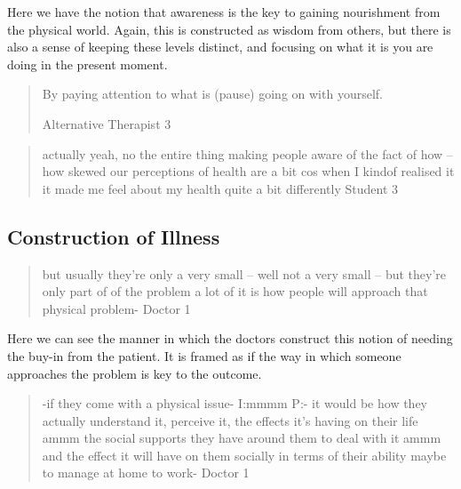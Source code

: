 Here we have the notion that awareness is the key to gaining nourishment from the physical world. Again, this is constructed as wisdom from others, but there is also a sense of keeping these levels distinct, and focusing on what it is you are doing in the present moment. 

\begin{quotation}
  
By paying attention to what is (pause) going on with yourself.

Alternative Therapist 3
\end{quotation}

\begin{quotation}
  actually yeah, no the entire thing making people aware of the fact of how – how skewed our perceptions of health are a bit cos when I kindof realised it it made me feel about my health quite a bit differently
Student 3
\end{quotation}




\subsection{Construction of Illness}
\label{sec:construction-illness}

\begin{quotation}
  but usually they're only a very small – well not a very small – but they're only part of of the problem a lot of it is how people will approach that physical problem-
Doctor 1
\end{quotation}

Here  we can see the manner in which the doctors construct this notion of needing the buy-in from the patient. It is framed as if the way in which someone approaches the problem is key to the outcome. 

\begin{quotation}
  -if they come with a physical issue-
I:mmmm
P:- it would be how they actually understand it, perceive it, the effects it's having on their life ammm the social supports they have around them to deal with it ammm and the effect it will have on them socially in terms of their ability maybe to manage at home to work-
Doctor 1
\end{quotation}

